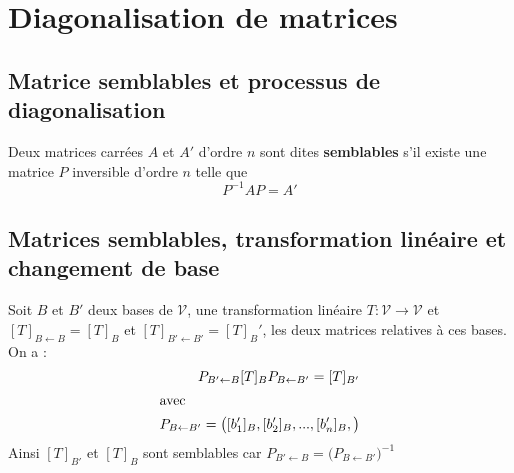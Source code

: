\section{Diagonalisation de matrices}
	\subsection{Matrice semblables et processus de diagonalisation}
		\begin{mydef}
			Deux matrices carrées $A$ et $A'$ d'ordre $n$ sont dites \textbf{semblables} s'il existe une matrice $P$ inversible d'ordre $n$ telle que \[P^{-1}A P=A'\]
		\end{mydef}
	\subsection{Matrices semblables, transformation linéaire et changement de base}
		\begin{myprop}
			Soit $B$ et $B'$ deux bases de $\mathcal{V}$, une transformation linéaire $T:\mathcal{V}\longrightarrow\mathcal{V}$ et $[T]_{B\leftarrow B}=[T]_B$ et $[T]_{B'\leftarrow B'}=[T]_B'$, les deux matrices relatives à ces bases. On a :	\begin{align*}
				P_{B'\leftarrow B}[T]_{B}P_{B\leftarrow B'}=[T]_{B'}\\
				\intertext{avec}
				P_{B\leftarrow B'}=\big([b'_1]_B,[b'_2]_B,...,[b'_n]_B, \big)
			\end{align*}
			Ainsi $[T]_{B'}$ et $[T]_B$ sont semblables car $P_{B'\leftarrow B}=\big(P_{B\leftarrow B'}\big)^{-1}$
		\end{myprop}
